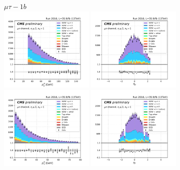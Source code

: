 \begin{figure}[ht]
    \centering
    $\mu\tau - 1b$ \\
    \includegraphics[width=0.4\textwidth]{chapters/Analysis/sectionPlots/figures/kinematics_pickles/mutau/1b/mutau_1b_lepton1_pt.pdf}
    \includegraphics[width=0.4\textwidth]{chapters/Analysis/sectionPlots/figures/kinematics_pickles/mutau/1b/mutau_1b_lepton1_eta.pdf}
    \includegraphics[width=0.4\textwidth]{chapters/Analysis/sectionPlots/figures/kinematics_pickles/mutau/1b/mutau_1b_lepton2_pt.pdf}
    \includegraphics[width=0.4\textwidth]{chapters/Analysis/sectionPlots/figures/kinematics_pickles/mutau/1b/mutau_1b_lepton2_eta.pdf}

\end{figure}
